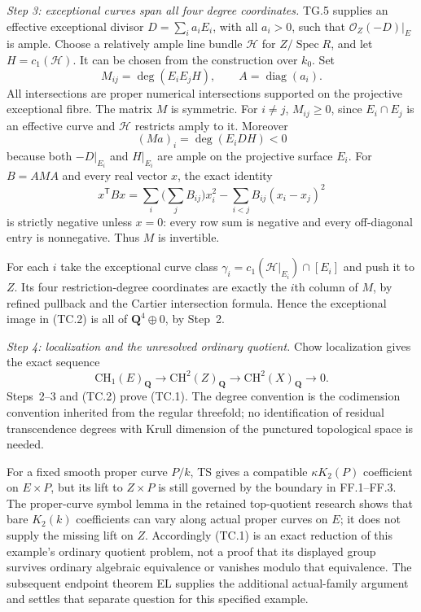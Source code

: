 \emph{Step 3: exceptional curves span all four degree coordinates.}
TG.5 supplies an effective exceptional divisor
$D=\sum_i a_iE_i$, with all $a_i>0$, such that
$\mathcal O_Z(-D)|_E$ is ample.  Choose a relatively ample line
bundle $\mathcal H$ for $Z/\operatorname{Spec}R$, and let
$H=c_1(\mathcal H)$.  It can be chosen from the construction over
$k_0$.  Set
\[
       M_{ij}=\deg(E_iE_jH),\qquad A=\operatorname{diag}(a_i).
\]
All intersections are proper numerical intersections supported on
the projective exceptional fibre.  The matrix $M$ is symmetric.
For $i\ne j$, $M_{ij}\geq0$, since $E_i\cap E_j$ is an effective
curve and $\mathcal H$ restricts amply to it.  Moreover
\[
       (Ma)_i=\deg(E_iDH)<0
\]
because both $-D|_{E_i}$ and $H|_{E_i}$ are ample on the projective
surface $E_i$.  For $B=AMA$ and every real vector $x$, the exact
identity
\[
 x^{\mathsf T}Bx
   =\sum_i\biggl(\sum_jB_{ij}\biggr)x_i^2
       -\sum_{i<j}B_{ij}(x_i-x_j)^2
\]
is strictly negative unless $x=0$: every row sum is negative and
every off-diagonal entry is nonnegative.  Thus $M$ is invertible.

For each $i$ take the exceptional curve class
$\gamma_i=c_1(\mathcal H|_{E_i})\cap[E_i]$ and push it to $Z$.
Its four restriction-degree coordinates are exactly the $i$th
column of $M$, by refined pullback and the Cartier intersection
formula.  Hence the exceptional image in (TC.2) is all of
$\mathbf Q^4\oplus0$, by Step~2.

\emph{Step 4: localization and the unresolved ordinary quotient.}
Chow localization gives the exact sequence
\[
       \mathrm{CH}_1(E)_{\mathbf Q}
           \longrightarrow\mathrm{CH}^{2}(Z)_{\mathbf Q}
           \longrightarrow\mathrm{CH}^{2}(X)_{\mathbf Q}
           \longrightarrow0.
\]
Steps~2--3 and (TC.2) prove (TC.1).  The degree convention is the
codimension convention inherited from the regular threefold; no
identification of residual transcendence degrees with Krull
dimension of the punctured topological space is needed.

For a fixed smooth proper curve $P/k$, TS gives a compatible
$\kappa K_2(P)$ coefficient on $E\times P$, but its lift to
$Z\times P$ is still governed by the boundary in FF.1--FF.3.
The proper-curve symbol lemma in the retained top-quotient research
shows that bare $K_2(k)$ coefficients can vary along actual proper
curves on $E$; it does not supply the missing lift on $Z$.
Accordingly (TC.1) is an exact reduction of this example's ordinary
quotient problem, not a proof that its displayed group survives
ordinary algebraic equivalence or vanishes modulo that equivalence.
The subsequent endpoint theorem EL supplies the additional
actual-family argument and settles that separate question for
this specified example.
